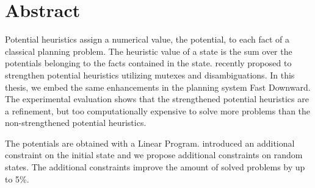\chapter{Abstract}\label{ch:abstract}

Potential heuristics assign a numerical value, the potential, to each fact of a classical planning problem.
The heuristic value of a state is the sum over the potentials belonging to the facts contained in the state.
\citeauthor{fivser2020strengthening} recently proposed to strengthen potential heuristics utilizing mutexes and disambiguations.
In this thesis, we embed the same enhancements in the planning system Fast Downward.
The experimental evaluation shows that the strengthened potential heuristics are a refinement, but too computationally expensive to solve more problems than the non-strengthened potential heuristics.

The potentials are obtained with a Linear Program.
\citeauthor{fivser2020strengthening} introduced an additional constraint on the initial state and we propose additional constraints on random states.
The additional constraints improve the amount of solved problems by up to 5\%.
